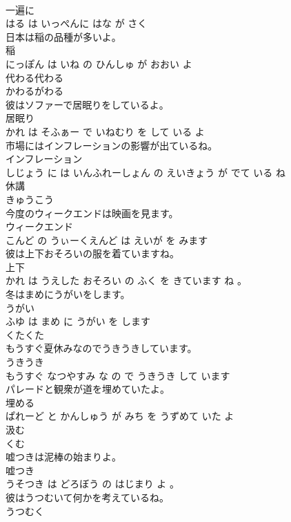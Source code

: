 \documentclass[8pt]{extreport}
\begin{document}
\begin{CJK}{UTF8}{min}
\\	一遍に 
\\	はる は いっぺんに はな が さく			
\\	日本は稲の品種が多いよ。	
\\	稲 
\\	にっぽん は いね の ひんしゅ が おおい よ			
\\	代わる代わる	
\\	かわるがわる			
\\	彼はソファーで居眠りをしているよ。	
\\	居眠り 
\\	かれ は そふぁー で いねむり を して いる よ			
\\	市場にはインフレーションの影響が出ているね。	
\\	インフレーション 
\\	しじょう に は いんふれーしょん の えいきょう が でて いる ね			
\\	休講	
\\	きゅうこう			
\\	今度のウィークエンドは映画を見ます。	
\\	ウィークエンド 
\\	こんど の うぃーくえんど は えいが を みます			
\\	彼は上下おそろいの服を着ていますね。	
\\	上下 
\\	かれ は うえした おそろい の ふく を きています ね 。			
\\	冬はまめにうがいをします。	
\\	うがい 
\\	ふゆ は まめ に うがい を します			
\\	くたくた	
\\	もうすぐ夏休みなのでうきうきしています。	
\\	うきうき 
\\	もうすぐ なつやすみ な の で うきうき して います			
\\	パレードと観衆が道を埋めていたよ。	
\\	埋める 
\\	ぱれーど と かんしゅう が みち を うずめて いた よ			
\\	汲む	
\\	くむ			
\\	嘘つきは泥棒の始まりよ。	
\\	嘘つき 
\\	うそつき は どろぼう の はじまり よ 。			
\\	彼はうつむいて何かを考えているね。	
\\	うつむく 

\end{CJK}
\end{document}
